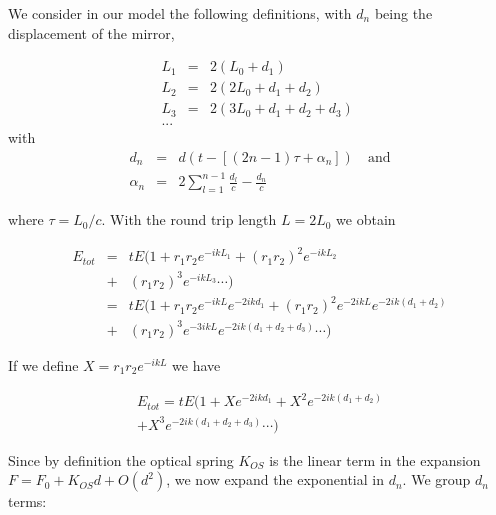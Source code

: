 We consider in our model the following definitions, with $d_n$ being the displacement of the mirror,

\begin{eqnarray}
L_1&=&2(L_0+d_1)\\
L_2&=&2(2L_0+d_1+d_2)\nonumber\\
L_3&=&2(3L_0+d_1+d_2+d_3)\,\, \nonumber\\ %
...\nonumber
\end{eqnarray}
with 
\begin{eqnarray}
\label{eqn:dn1}
d_n &=& d(t-[(2n-1)\tau + \alpha_n ]) \quad \mbox{and}\\
\label{eqn:dn2}
\alpha_n &=& 2\sum\limits_{l=1}^{n-1}\frac{d_l}{c}-\frac{d_n}{c}
\end{eqnarray}

where $\tau=L_0/c$.
With the round trip length $L=2L_0$  we obtain

\begin{eqnarray}
E_{tot}&=&tE(1\!+\!r_1r_2 e^{-ikL_1}\!\!+\!(r_1r_2)^2 e^{-ikL_2}\nonumber\\
&+&(r_1r_2)^3 e^{-ikL_3}  \cdots )\nonumber\\
&=&tE(1\!+\!r_1r_2 e^{-ikL}e^{-2ikd_1}\!\!+\!(r_1r_2)^2 e^{-2ikL}e^{-2ik(d_1\!+\!d_2)}\nonumber\\
&+&(r_1r_2)^3 e^{-3ikL}e^{-2ik(d_1\!+\!d_2\!+\!d_3)}  \cdots )\nonumber
\end{eqnarray}



If we define $X=r_1r_2 e^{-ikL}$ we have 

\begin{eqnarray}
E_{tot}=tE(1+Xe^{-2ikd_1} +X^2e^{-2ik(d_1+d_2)}\nonumber\\
+X^3e^{-2ik(d_1+d_2+d_3)} \cdots )\nonumber
\end{eqnarray}

Since by definition the optical spring $K_{OS}$ is the linear term in the expansion $F=F_0+ K_{OS} d + O(d^2)$, we now expand the exponential in $d_n$. We group  $d_n$ terms:

